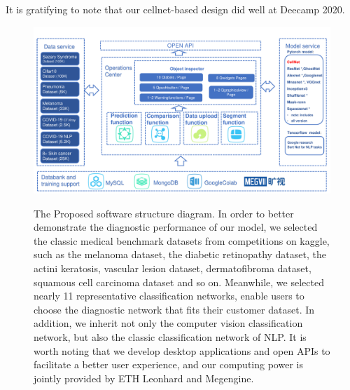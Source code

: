 It is gratifying to note that our cellnet-based design did well at  Deecamp 2020.
\begin{figure}[t]
\begin{center}
\includegraphics[height=0.3\textheight]{thesis-template-master/images/2020DeeCamp_ppt_tcy (1).pdf}
\label{fig:cellnet}
\end{center}
\caption{ The Proposed software structure diagram.
In order to better demonstrate the diagnostic performance of our model, we selected the classic  medical benchmark datasets from competitions on kaggle, such as the melanoma dataset, the diabetic retinopathy dataset, the actini keratosis, vascular lesion dataset, dermatofibroma dataset, squamous cell carcinoma dataset and so on. Meanwhile, we selected nearly 11  representative classification networks, enable users to choose the diagnostic network that fits their customer dataset. In addition, we inherit not only the computer vision classification network, but also the classic classification network of NLP. It is worth noting that we develop desktop applications and open APIs to facilitate a better user experience, and our computing power is jointly provided by ETH Leonhard and Megengine.}
\end{figure}

